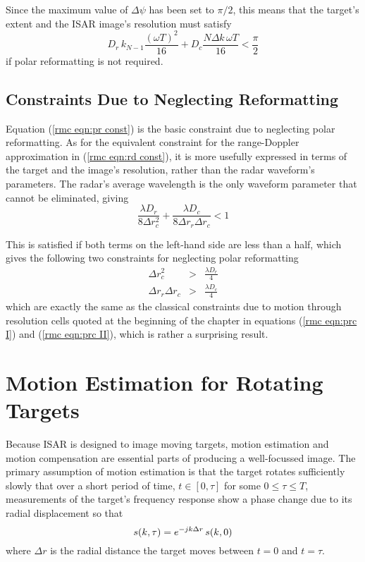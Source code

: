 Since the maximum value of $\Delta\psi$ has been set to $\pi/2$,
this means that the target's extent and the ISAR image's resolution 
must satisfy
\begin{equation}\label{rmc eqn:pr const}
D_r\,k_{N-1}\frac{(\omega T)^2}{16}
+D_c\frac{N\Delta k\,\omega T}{16}<\frac{\pi}{2}
\end{equation}
if polar reformatting is not required.

\subsection{Constraints Due to Neglecting Reformatting}

Equation (\ref{rmc eqn:pr const}) is the basic constraint due to neglecting
polar reformatting.  As for the equivalent constraint for the range-Doppler
approximation in (\ref{rmc eqn:rd const}), it is more usefully expressed
in terms of the target and the image's resolution, rather than the radar 
waveform's parameters.  The radar's average wavelength is the only waveform
parameter that cannot be eliminated, giving
\begin{equation}
\frac{\lambda D_r}{8\Delta r_c^2}+
\frac{\lambda D_c}{8\Delta r_r\Delta r_c}<1
\end{equation}

This is satisfied if both terms on the left-hand side are less than a half,
which gives the following two constraints for neglecting polar reformatting
\begin{eqnarray}
\Delta r_c^2&>&\frac{\lambda D_r}{4}		\label{rmc eqn:prc Ia}\\
\Delta r_r\Delta r_c&>&\frac{\lambda D_c}{4}	\label{rmc eqn:prc IIa}
\end{eqnarray}
which are exactly the same as the classical constraints due to motion
through resolution cells quoted at the beginning of the chapter in 
equations (\ref{rmc eqn:prc I}) and (\ref{rmc eqn:prc II}), which is rather
a surprising result.

\section{Motion Estimation for Rotating Targets}
\label{rmc sec:me}

Because ISAR is designed to image moving targets, motion estimation and
motion compensation are essential parts of producing a well-focussed image.
The primary assumption of motion estimation is that the target rotates
sufficiently slowly that over a short period of time, $t\in[0,\tau]$ for
some $0\leq\tau\leq T$, measurements of the target's frequency response show
a phase change due to its radial displacement so that
\begin{equation}
s(k,\tau)=e^{-jk{\Delta r}} \,s(k,0)
\end{equation}
where $\Delta r$ is the radial distance the target moves between $t=0$ and
$t=\tau$.


